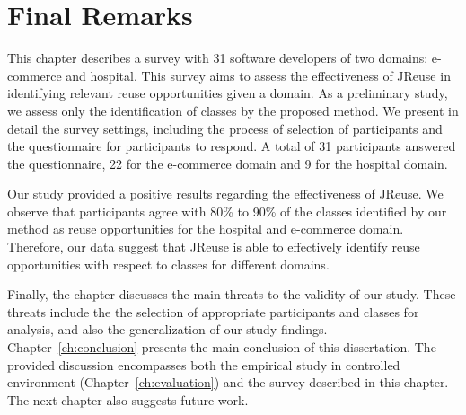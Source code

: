 \section{Final Remarks}
\label{ch5sc:finalRemarks}



This chapter describes a survey with 31 software developers of two domains: e-commerce and hospital. This survey aims to assess the effectiveness of JReuse in identifying relevant reuse opportunities given a domain. As a preliminary study, we assess only the identification of classes by the proposed method. We present in detail the survey settings, including the process of selection of participants and the questionnaire for participants to respond. A total of 31 participants answered the questionnaire, 22 for the e-commerce domain and 9 for the hospital domain. 

Our study provided a positive results regarding the effectiveness of JReuse. We observe that participants agree with 80\% to  90\% of the classes identified by our method as reuse opportunities for the hospital and e-commerce domain. Therefore, our data suggest that JReuse is able to effectively identify reuse opportunities with respect to classes for different domains.

Finally, the chapter discusses the main threats to the validity of our study. These threats include the the selection of appropriate participants and classes for analysis, and also the generalization of our study findings. Chapter~\ref{ch:conclusion} presents the main conclusion of this dissertation. The provided discussion encompasses both the empirical study in controlled environment (Chapter~\ref{ch:evaluation}) and the survey described in this chapter. The next chapter also suggests future work.
